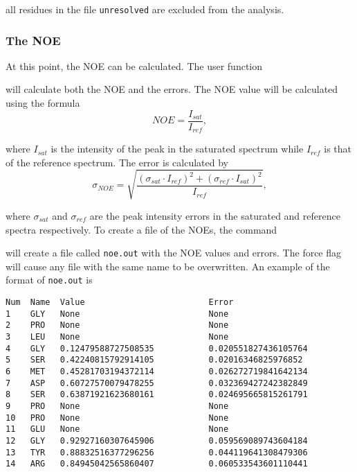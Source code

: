 
all residues in the file \texttt{unresolved} are excluded from the analysis.


\subsubsection{The NOE}

At this point, the NOE can be calculated.  The user function


will calculate both the NOE and the errors.  The NOE value will be calculated using the formula
\begin{equation}
NOE = \frac{I_{sat}}{I_{ref}},
\end{equation}

\noindent where $I_{sat}$ is the intensity of the peak in the saturated spectrum while $I_{ref}$ is that of the reference spectrum.  The error is calculated by
\begin{equation}
\sigma_{NOE} = \sqrt{\frac{(\sigma_{sat} \cdot I_{ref})^2 + (\sigma_{ref} \cdot I_{sat})^2}{I_{ref}}},
\end{equation}

\noindent where $\sigma_{sat}$ and $\sigma_{ref}$ are the peak intensity errors in the saturated and reference spectra respectively.  To create a file of the NOEs, the command


will create a file called \texttt{noe.out} with the NOE values and errors.  The force flag will cause any file with the same name to be overwritten.  An example of the format of \texttt{noe.out} is

{\footnotesize \begin{verbatim}
Num  Name  Value                         Error
1    GLY   None                          None
2    PRO   None                          None
3    LEU   None                          None
4    GLY   0.12479588727508535           0.020551827436105764
5    SER   0.42240815792914105           0.02016346825976852
6    MET   0.45281703194372114           0.026272719841642134
7    ASP   0.60727570079478255           0.032369427242382849
8    SER   0.63871921623680161           0.024695665815261791
9    PRO   None                          None
10   PRO   None                          None
11   GLU   None                          None
12   GLY   0.92927160307645906           0.059569089743604184
13   TYR   0.88832516377296256           0.044119641308479306
14   ARG   0.84945042565860407           0.060533543601110441
\end{verbatim}}


